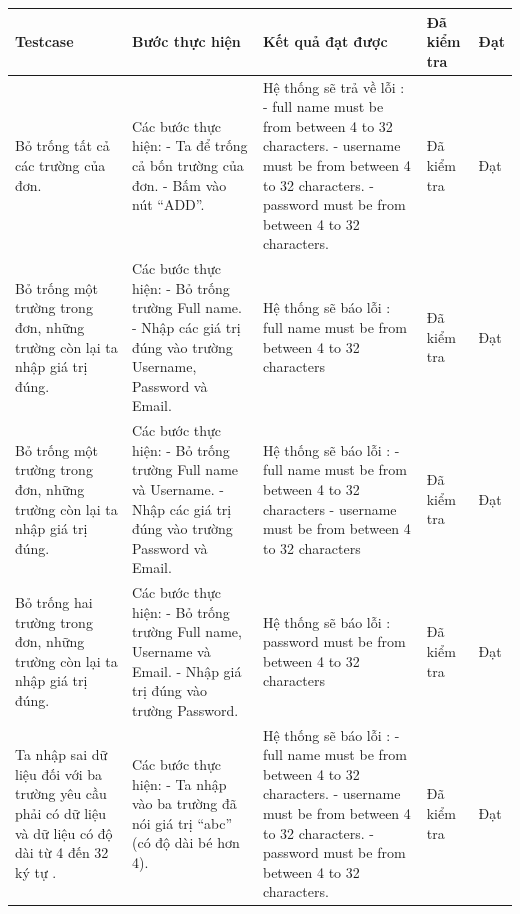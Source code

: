 \documentclass[a4paper]{article}
\begin{document}
\begin{longtable}{ | p{} |p{} | p{}  | p{}  | p{}  | } 
\hline
\textbf{Testcase}& \textbf{Bước thực hiện}& \textbf{Kết quả đạt được} & \textbf{Đã kiểm tra}& \textbf{Đạt} \\ 
\hline
\hline
Bỏ trống tất cả các trường của đơn. &
Các bước thực hiện: \newline
- Ta để trống cả bốn trường của đơn. \newline
- Bấm vào nút “ADD”. 
&
Hệ thống sẽ trả về lỗi : \newline
- full name must be from between 4 to 32 characters. \newline
- username must be from between 4 to 32 characters. \newline
- password must be from between 4 to 32 characters.
&
Đã kiểm tra &
Đạt \\

\hline
Bỏ trống một trường trong đơn, những trường còn lại ta nhập giá trị đúng. &
Các bước thực hiện: \newline
- Bỏ trống trường Full name.  \newline
- Nhập các giá trị đúng vào trường Username, Password và Email. 
&
Hệ thống sẽ báo lỗi : full name must be from between 4 to 32 characters
&
Đã kiểm tra &
Đạt \\

\hline
Bỏ trống một trường trong đơn, những trường còn lại ta nhập giá trị đúng. &
Các bước thực hiện: \newline
- Bỏ trống trường Full name và Username. \newline
- Nhập các giá trị đúng vào trường Password và Email. 
&
Hệ thống sẽ báo lỗi : \newline
- full name must be from between 4 to 32 characters \newline
- username must be from between 4 to 32 characters
&
Đã kiểm tra &
Đạt \\

\hline
Bỏ trống hai trường trong đơn, những trường còn lại ta nhập giá trị đúng. &
Các bước thực hiện: \newline
- Bỏ trống trường Full name, Username  và Email.  \newline
- Nhập giá trị đúng vào trường Password.
&
Hệ thống sẽ báo lỗi : password must be from between 4 to 32 characters
&
Đã kiểm tra &
Đạt \\

\hline
Ta nhập sai dữ liệu đối với ba trường yêu cầu phải có dữ liệu và dữ liệu có độ dài từ 4 đến 32 ký tự . &
Các bước thực hiện: \newline
- Ta nhập vào ba trường đã nói giá trị “abc” (có độ dài bé hơn 4).  \newline
&
Hệ thống sẽ báo lỗi : \newline
- full name must be from between 4 to 32 characters. \newline
- username must be from between 4 to 32 characters. \newline
- password must be from between 4 to 32 characters.
&
Đã kiểm tra &
Đạt \\


\end{longtable}
\end{document}
